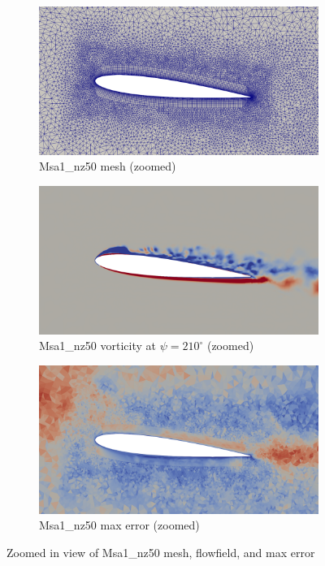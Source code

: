 \begin{figure}[H]
	\centering
	\begin{subfigure}[b]{0.7\textwidth}
		\centering
		\includegraphics[width=1\textwidth]{figures/adapt_strat/zoomed/Msa1_mesh.png}
		\caption{Msa1\_nz50 mesh (zoomed)}
		\label{fig:Msa1_mesh_zoomed}
	\end{subfigure}
	\begin{subfigure}[b]{0.7\textwidth}
		\centering
		\includegraphics[width=1\textwidth]{figures/adapt_strat/zoomed/Msa1_ph_210.png}
		\caption{Msa1\_nz50 vorticity at $\psi=210^\circ$ (zoomed)}
		\label{fig:Msa1_vorticity_zoomed}
	\end{subfigure}
	\begin{subfigure}[b]{0.7\textwidth}
		\centering
		\includegraphics[width=1\textwidth]{figures/adapt_strat/zoomed/Msa1_error.png}
		\caption{Msa1\_nz50 max error (zoomed)}
		\label{fig:Msa1_max_error_zoomed}
	\end{subfigure}
	\caption{Zoomed in view of Msa1\_nz50 mesh, flowfield, and max error}
	\label{fig:Msa1_zoomed}
\end{figure}



